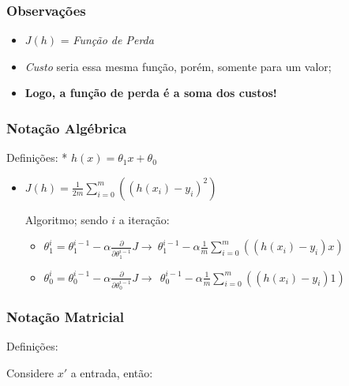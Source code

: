 \documentclass[12pt]{article}
\providecommand{\tightlist}{%
      \setlength{\itemsep}{0pt}\setlength{\parskip}{0pt}}
\begin{document}
\hypertarget{observauxe7uxf5es}{%
\subsubsection{Observações}\label{observauxe7uxf5es}}

\begin{itemize}
\item
  \(J(h)\) = \emph{Função de Perda}
\item
  \emph{Custo} seria essa mesma função, porém, somente para um valor;
\item
  \textbf{Logo, a função de perda é a soma dos custos!}
\end{itemize}

\hypertarget{notauxe7uxe3o-alguxe9brica}{%
\subsubsection{Notação Algébrica}\label{notauxe7uxe3o-alguxe9brica}}

Definições: * \(h(x)=\theta_1x+\theta_0\)

\begin{itemize}
\item
  \(J(h)=\frac{1}{2m}\sum\limits_{i=0}^{m}((h(x_i)-y_i)^2)\)

  Algoritmo; sendo \(i\) a iteração:

  \begin{itemize}
  \tightlist
  \item
    \(\theta^i_1= \theta_1^{i-1} - \alpha \frac{\partial}{\partial \theta_1^{i-1}}J \to ~  \theta_1^{i-1} - \alpha \frac{1}{m}\sum\limits_{i=0}^{m}((h(x_i)-y_i)x)\)
  \item
    \(\theta^i_0= \theta_0^{i-1} - \alpha \frac{\partial}{\partial \theta_0^{i-1}}J \to ~  \ \theta_0^{i-1} - \alpha \frac{1}{m}\sum\limits_{i=0}^{m}((h(x_i)-y_i)1)\)
  \end{itemize}
\end{itemize}

\hypertarget{notauxe7uxe3o-matricial}{%
\subsubsection{Notação Matricial}\label{notauxe7uxe3o-matricial}}

Definições:

Considere \(x'\) a entrada, então:
\end{document}
